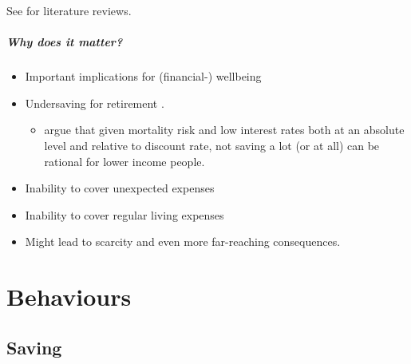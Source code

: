 \documentclass[a4paper, 11pt]{report}
\begin{document}
See \citet{agarwal2017shapes,greenberg2019financial} for literature reviews.


\paragraph{Why does it matter?}
\begin{itemize}
	\item Important implications for (financial-) wellbeing \citep{lynch2011introduction}

	\item Undersaving for retirement \citep{benartzi2013behavioral}.
	\begin{itemize}
		\item \citet{scott2020can} argue that given mortality risk and low interest rates both at an absolute level and relative to discount rate, not saving a lot (or at all) can be rational for lower income people.
	\end{itemize}

	\item Inability to cover unexpected expenses \citep{lusardi2011financially}

	\item Inability to cover regular living expenses

	\item Might lead to scarcity and even more far-reaching consequences.
\end{itemize}



					\chapter{Behaviours}

\section{Saving}
\end{document}
